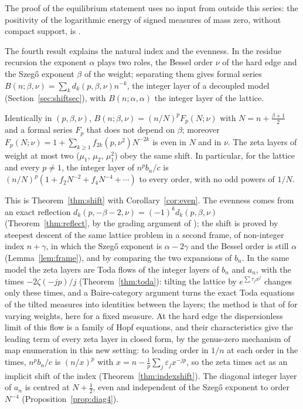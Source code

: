 The proof of the equilibrium statement uses no input from outside this series: the positivity of the logarithmic energy of
signed measures of mass zero, without compact support, is \cite[Lemma~3.3]{PaperI}.

The fourth result explains the natural index and the evenness. In the residue recursion the exponent $\alpha$ plays two roles,
the Bessel order $\nu$ of the hard edge and the Szeg\H{o} exponent $\beta$ of the weight; separating them gives formal series
$B(n;\beta,\nu)=\sum_kd_k(p,\beta,\nu)n^{-k}$, the integer layer of a decoupled model (Section~\ref{sec:shiftsec}), with
$B(n;\alpha,\alpha)$ the integer layer of the lattice.

\begin{mainthm}\label{thm:D}
Identically in $(p,\beta,\nu)$, $B(n;\beta,\nu)=(n/N)^pF_p(N;\nu)$ with $N=n+\frac{\beta+1}2$ and a formal series $F_p$ that does not
depend on $\beta$; moreover $F_p(N;\nu)=1+\sum_{k\ge1}f_{2k}(p,\nu^2)N^{-2k}$ is even in $N$ and in $\nu$. The zeta layers of weight at
most two ($\mu_1$, $\mu_2$, $\mu_1^2$) obey the same shift. In particular, for the lattice and every $p\ne1$, the integer layer of
$n^pb_n/c$ is $(n/N)^p(1+f_2N^{-2}+f_4N^{-4}+\dotsb)$ to every order, with no odd powers of $1/N$.
\end{mainthm}

This is Theorem~\ref{thm:shift} with Corollary~\ref{cor:even}. The evenness comes from an exact reflection
$d_k(p,-\beta-2,\nu)=(-1)^kd_k(p,\beta,\nu)$ (Theorem~\ref{thm:reflect}, by the grading argument of \cite{KuijlaarsTibboel}); the shift is proved by steepest descent of the same lattice
problem in a second frame, of non-integer index $n+\gamma$, in which the Szeg\H{o} exponent is $\alpha-2\gamma$ and the Bessel order is
still $\alpha$ (Lemma~\ref{lem:frame}), and by comparing the two expansions of $b_n$. In the same model the zeta layers are Toda flows
of the integer layers of $b_n$ and $a_n$, with the times $-2\zeta(-jp)/j$ (Theorem~\ref{thm:toda}): tilting the lattice by
$e^{\sum\tau_jx^j}$ changes only these times, and a Baire-category argument turns the exact Toda equations of the tilted measures into
identities between the layers; the method is that of \cite{EMP} for varying weights, here for a fixed measure. At the hard edge the
dispersionless limit of this flow is a family of Hopf equations, and their characteristics give the leading term of every zeta layer in
closed form, by the genus-zero mechanism of map enumeration \cite{Ercolani,EMP} in this new setting: to leading order in $1/n$ at each order in the times,
$n^pb_n/c$ is $(n/x)^p$ with $x=n-\frac1p\sum_j\varepsilon_jx^{-jp}$, so the zeta times act as an implicit shift of the index
(Theorem~\ref{thm:indexshift}). The diagonal integer layer of $a_n$ is centred at $N+\frac12$, even and independent of the Szeg\H{o}
exponent to order $N^{-4}$ (Proposition~\ref{prop:diag4}).

